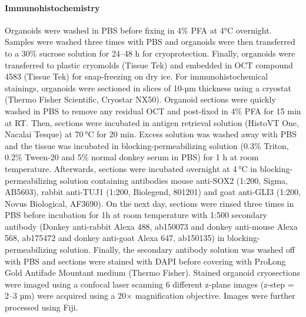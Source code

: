 \paragraph{Immunohistochemistry}
Organoids were washed in PBS before fixing in 4\% PFA at 4°C overnight. Samples were washed three times with PBS and organoids were then transferred to a 30\% sucrose solution for 24–48 h for cryoprotection. Finally, organoids were transferred to plastic cryomolds (Tissue Tek) and embedded in OCT compound 4583 (Tissue Tek) for snap-freezing on dry ice. For immunohistochemical stainings, organoids were sectioned in slices of 10-µm thickness using a cryostat (Thermo Fisher Scientific, Cryostar NX50). Organoid sections were quickly washed in PBS to remove any residual OCT and post-fixed in 4\% PFA for 15 min at RT. Then, sections were incubated in antigen retrieval solution (HistoVT One, Nacalai Tesque) at 70 °C for 20 min. Excess solution was washed away with PBS and the tissue was incubated in blocking-permeabilizing solution (0.3\% Triton, 0.2\% Tween-20 and 5\% normal donkey serum in PBS) for 1 h at room temperature. Afterwards, sections were incubated overnight at 4 °C in blocking-permeabilizing solution containing antibodies mouse anti-SOX2 (1:200, Sigma, ​​AB5603), rabbit anti-TUJ1 (1:200, Biolegend, 801201) and goat anti-GLI3 (1:200, Novus Biological, AF3690). On the next day, sections were rinsed three times in PBS before incubation for 1h at room temperature with 1:500 secondary antibody (Donkey anti-rabbit Alexa 488, ab150073 and donkey anti-mouse Alexa 568, ab175472 and donkey anti-goat Alexa 647, ab150135) in blocking-permeabilizing solution. Finally, the secondary antibody solution was washed off with PBS and sections were stained with DAPI before covering with ProLong Gold Antifade Mountant medium (Thermo Fisher). Stained organoid cryosections were imaged using a confocal laser scanning 6 different z-plane images (z-step = 2–3 µm) were acquired using a 20× magnification objective. Images were further processed using Fiji.

